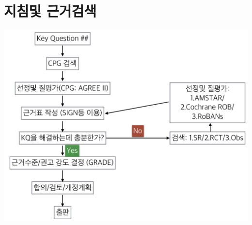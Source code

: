 \documentclass[]{book}
\begin{document}
\hypertarget{section-54}{%
\section{지침및 근거검색}\label{section-54}}

\includegraphics{static/SearchProcess.png}
\end{document}
